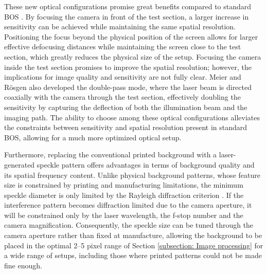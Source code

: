 \par These new optical configurations promise great benefits compared to standard BOS \cite{Meier&Roesgen2013}. By focusing the camera in front of the test section, a larger increase in sensitivity can be achieved while maintaining the same spatial resolution. Positioning the focus beyond the physical position of the screen allows for larger effective defocusing distances while maintaining the screen close to the test section, which greatly reduces the physical size of the setup. Focusing the camera inside the test section promises to improve the spatial resolution; however, the implications for image quality and sensitivity are not fully clear. Meier and Rösgen also developed the double-pass mode, where the laser beam is directed coaxially with the camera through the test section, effectively doubling the sensitivity by capturing the deflection of both the illumination beam and the imaging path. The ability to choose among these optical configurations alleviates the constraints between sensitivity and spatial resolution present in standard BOS, allowing for a much more optimized optical setup.

\par Furthermore, replacing the conventional printed background with a laser-generated speckle pattern offers advantages in terms of background quality and its spatial frequency content. Unlike physical background patterns, whose feature size is constrained by printing and manufacturing limitations, the minimum speckle diameter is only limited by the Rayleigh diffraction criterion \cite{Barker&Fourney}. If the interference pattern becomes diffraction limited due to the camera aperture, it will be constrained only by the laser wavelength, the f-stop number and the camera magnification. Consequently, the speckle size can be tuned through the camera aperture rather than fixed at manufacture, allowing the background to be placed in the optimal 2--5 pixel range of Section \ref{subsection: Image processing} for a wide range of setups, including those where printed patterns could not be made fine enough.

